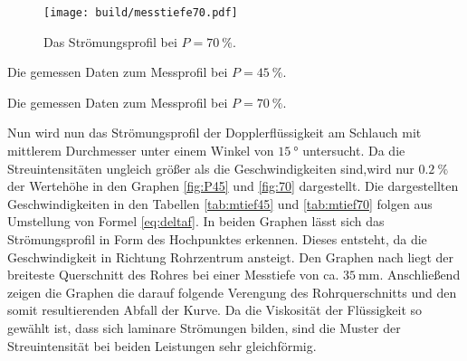 \begin{figure}
 \centering
 \caption{Das Strömungsprofil bei $P = \SI{70}{\percent}$.}
 \texttt{[image: build/messtiefe70.pdf]}
 \label{fig:P70}
\end{figure}

\begin{table}
 \centering
 \caption{Die gemessen Daten zum Messprofil bei $P = \SI{45}{\percent}$.}
 
 \label{tab:mtief45}
\end{table}

\begin{table}
 \centering
 \caption{Die gemessen Daten zum Messprofil bei $P = \SI{70}{\percent}$.}
 
 \label{tab:mtief70}
\end{table}

Nun wird nun das Strömungsprofil der Dopplerflüssigkeit am Schlauch mit mittlerem
Durchmesser unter einem Winkel von $\SI{15}{\degree}$ untersucht. Da die Streuintensitäten ungleich größer als die Geschwindigkeiten
sind,wird nur $\SI{0.2}{\percent}$ der Wertehöhe in den Graphen \ref{fig:P45} und \ref{fig:70} dargestellt. Die
dargestellten Geschwindigkeiten in den Tabellen \ref{tab:mtief45} und \ref{tab:mtief70} folgen aus Umstellung von Formel \ref{eq:deltaf}.
 In beiden Graphen lässt sich das Strömungsprofil in Form des Hochpunktes erkennen. Dieses
 entsteht, da die Geschwindigkeit in Richtung Rohrzentrum ansteigt. Den Graphen nach liegt
 der breiteste Querschnitt des Rohres bei einer Messtiefe von ca. $\SI{35}{\milli\meter}$.
 Anschließend zeigen die Graphen die darauf folgende Verengung des Rohrquerschnitts
 und den somit resultierenden Abfall der Kurve. Da die Viskosität der Flüssigkeit so
 gewählt ist, dass sich laminare Strömungen bilden, sind die Muster der Streuintensität
 bei beiden Leistungen sehr gleichförmig.
